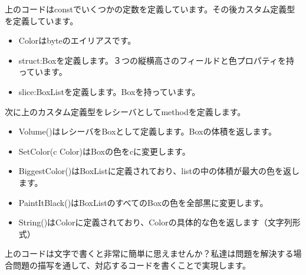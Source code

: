 上のコードはconstでいくつかの定数を定義しています。その後カスタム定義型を定義しています。

\begin{itemize}
  \item Colorはbyteのエイリアスです。
  \item struct:Boxを定義します。３つの縦横高さのフィールドと色プロパティを持っています。
  \item slice:BoxListを定義します。Boxを持っています。
\end{itemize}

次に上のカスタム定義型をレシーバとしてmethodを定義します。

\begin{itemize}
  \item Volume()はレシーバをBoxとして定義します。Boxの体積を返します。
  \item SetColor(c Color)はBoxの色をcに変更します。
  \item BiggestColor()はBoxListに定義されており、listの中の体積が最大の色を返します。
  \item PaintItBlack()はBoxListのすべてのBoxの色を全部黒に変更します。
  \item String()はColorに定義されており、Colorの具体的な色を返します（文字列形式）
\end{itemize}

上のコードは文字で書くと非常に簡単に思えませんか？私達は問題を解決する場合問題の描写を通して、対応するコードを書くことで実現します。


